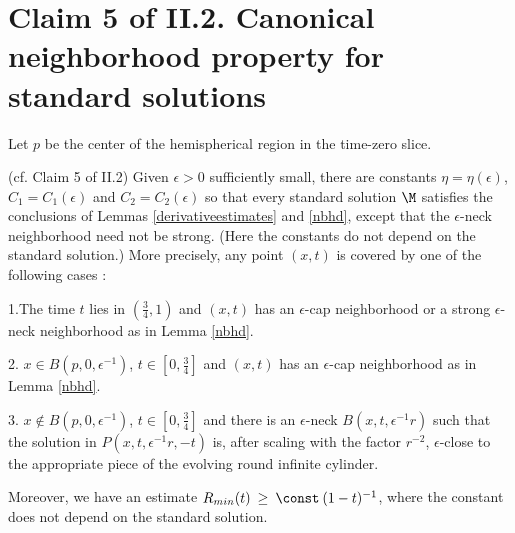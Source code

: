 \section{Claim 5 of II.2. Canonical neighborhood property for
standard solutions}
\label{secclaim5}

Let $p$ be the center of the hemispherical region in the time-zero slice.

\begin{lemma}
  \label{lem:kl-canonical-neighborhood-property-standard-solutions-existence-canonical-neighborhoods}
 (cf. Claim 5 of II.2) \label{claim5}
Given  $\epsilon > 0$ sufficiently small, there are constants
$\eta = \eta(\epsilon)$, $C_1 = C_1(\epsilon)$ and
$C_2 = C_2(\epsilon)$ so that
every standard solution $\M$ satisfies the conclusions of
Lemmas \ref{derivativeestimates} and \ref{nbhd},
except that the $\epsilon$-neck neighborhood
need not be strong. (Here the constants do not depend on the
standard solution.) More precisely,
any point $(x,t)$ is covered by one of the following cases :

1.The time $t$ lies in $(\frac34, 1)$ and
$(x,t)$ has an $\epsilon$-cap neighborhood
or a strong $\epsilon$-neck neighborhood as in
Lemma \ref{nbhd}.

2. $x \in B(p, 0, \epsilon^{-1})$, $t \in [0, \frac34]$ and
$(x,t)$ has an $\epsilon$-cap neighborhood as in Lemma \ref{nbhd}.

3. $x \notin B(p, 0, \epsilon^{-1})$, $t \in [0, \frac34]$ and
there is an $\epsilon$-neck $B(x,t,\epsilon^{-1} r)$
such that the solution in $P(x,t,\epsilon^{-1}r, -t)$ is, after
scaling with the factor $r^{-2}$, $\epsilon$-close to the appropriate
piece of the evolving round infinite cylinder.

Moreover, we have an estimate $R_{min}(t) \: \ge \: \const \: (1-t)^{-1}$, where
the constant does not depend on the standard solution.
\end{lemma}
